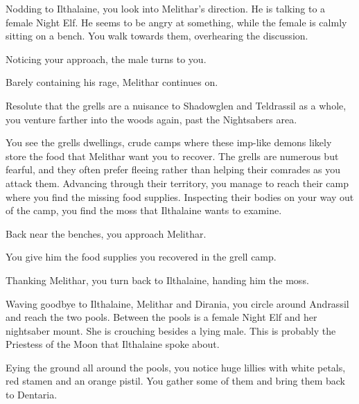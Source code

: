 Nodding to Ilthalaine, you look into Melithar's direction. He is talking to a female Night Elf. He seems to be angry at something, while the female is calmly sitting on a bench. You walk towards them, overhearing the discussion.


Noticing your approach, the male turns to you.


Barely containing his rage, Melithar continues on.


Resolute that the grells are a nuisance to Shadowglen and Teldrassil as a whole, you venture farther into the woods again, past the Nightsabers area.

You see the grells dwellings, crude camps where these imp-like demons likely store the food that Melithar want you to recover. The grells are numerous but fearful, and they often prefer fleeing rather than helping their comrades as you attack them. Advancing through their territory, you manage to reach their camp where you find the missing food supplies. Inspecting their bodies on your way out of the camp, you find the moss that Ilthalaine wants to examine.

Back near the benches, you approach Melithar.


You give him the food supplies you recovered in the grell camp.


Thanking Melithar, you turn back to Ilthalaine, handing him the moss.



Waving goodbye to Ilthalaine, Melithar and Dirania, you circle around Andrassil and reach the two pools. Between the pools is a female Night Elf and her nightsaber mount. She is crouching besides a lying male. This is probably the Priestess of the Moon that Ilthalaine spoke about.



Eying the ground all around the pools, you notice huge lillies with white petals, red stamen and an orange pistil. You gather some of them and bring them back to Dentaria.


